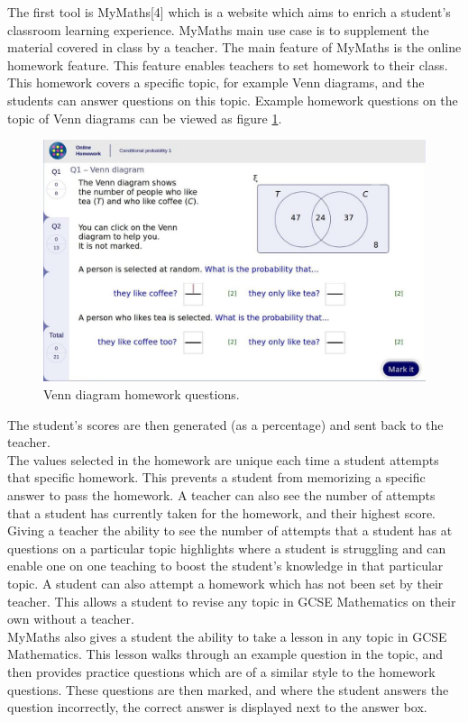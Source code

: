 \documentclass{article}
\begin{document}
The first tool is MyMaths[4] which is a website which aims to enrich a student's classroom learning experience. MyMaths main use case is to supplement the material covered in class by a teacher. The main feature of MyMaths is the online homework feature. This feature enables teachers to set homework to their class. This homework covers a specific topic, for example Venn diagrams, and the students can answer questions on this topic. Example homework questions on the topic of Venn diagrams can be viewed as figure \ref{figure:mymathsHomeworkQuestion1}.
\begin{figure}[H]
	\centering
	\includegraphics[width=0.9\linewidth]{./data/mymathsQuestion1.jpg}
	\caption{Venn diagram homework questions.}
	\label{figure:mymathsHomeworkQuestion1}
\end{figure}
The student's scores are then generated (as a percentage) and sent back to the teacher. \\

The values selected in the homework are unique each time a student attempts that specific homework. This prevents a student from memorizing a specific answer to pass the homework. A teacher can also see the number of attempts that a student has currently taken for the homework, and their highest score. Giving a teacher the ability to see the number of attempts that a student has at questions on a particular topic highlights where a student is struggling and can enable one on one teaching to boost the student's knowledge in that particular topic. A student can also attempt a homework which has not been set by their teacher. This allows a student to revise any topic in GCSE Mathematics on their own without a teacher. \\

MyMaths also gives a student the ability to take a lesson in any topic in GCSE Mathematics. This lesson walks through an example question in the topic, and then provides practice questions which are of a similar style to the homework questions. These questions are then marked, and where the student answers the question incorrectly, the correct answer is displayed next to the answer box. \\
\end{document}
